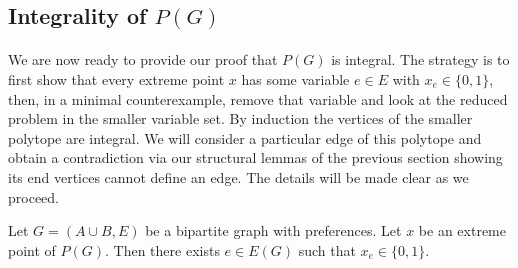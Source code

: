 \subsection{Integrality of $P(G)$}
\paragraph{}
We are now ready to provide our proof that $P(G)$ is integral. The strategy is to first show that every extreme point $x$ has some variable $e \in E$ with $x_e \in \{0,1\}$, then, in a minimal counterexample, remove that variable and look at the reduced problem in the smaller variable set. By induction the vertices of the smaller polytope are integral. We will consider a particular edge of this polytope and obtain a contradiction via our structural lemmas of the previous section showing its end vertices cannot define an edge. The details will be made clear as we proceed.
\begin{lemma}\label{lemma:01}
Let $G = (A\cup B, E)$ be a bipartite graph with preferences. Let $x$ be an extreme point of $P(G)$. Then there exists $e \in E(G)$ such that $x_e \in \{0,1\}$.
\end{lemma}

